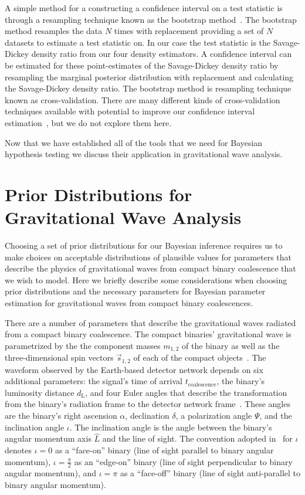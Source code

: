 A simple method for a constructing a confidence interval on a test statistic is through a resampling technique known as the bootstrap method~\cite{efron1992bootstrap}. The bootstrap method resamples the data $N$ times with replacement providing a set of $N$ datasets to estimate a test statistic on. In our case the test statistic is the Savage-Dickey density ratio from our four density estimators. A confidence interval can be estimated for these point-estimates of the Savage-Dickey density ratio by resampling the marginal posterior distribution with replacement and calculating the Savage-Dickey density ratio. The bootstrap method is resampling technique known as cross-validation. There are many different kinds of cross-validation techniques available with potential to improve our confidence interval estimation~\cite{efron1997improvements, vehtari2017practical}, but we do not explore them here.

Now that we have established all of the tools that we need for Bayesian hypothesis testing we discuss their application in gravitational wave analysis.

\section{Prior Distributions for Gravitational Wave Analysis}
Choosing a set of prior distributions for our Bayesian inference requires
us to make choices on acceptable distributions of plausible values for parameters that
describe the physics of gravitational waves from compact binary
coalescence that we wish to model. Here we briefly describe some considerations when choosing
prior distributions and the necessary parameters for Bayesian parameter estimation
for gravitational waves from compact binary coalescences.

There are a number of parameters that describe the gravitational waves
radiated from a compact binary coalescence. The compact binaries'
gravitational wave is parametrized by the 
the component masses $m_{1,2}$ of the binary as well as the three-dimensional spin vectors
$\vec{s}_{1,2}$ of each of the compact objects~\cite{Hawking:1987en}.
The waveform observed by the
Earth-based detector network depends on six additional parameters: the
signal's time of arrival $t_\mathrm{coalescence}$, the binary's luminosity distance
$d_\mathrm{L}$, and four Euler angles that describe the transformation from the
binary's radiation frame to the detector network frame~\cite{Wahlquist:1987rx}.  These
angles are the binary's right ascension $\alpha$,
declination $\delta$, a polarization angle $\Psi$, and the inclination angle
$\iota$. The inclination angle is the angle between the binary's angular momentum axis $\hat{L}$ 
and the line of
sight. The convention adopted in \pycbc{}\ for $\iota$ denotes $\iota = 0$ as a
``face-on'' binary (line of sight parallel to binary angular momentum), $\iota
= \frac{\pi}{2}$ as an ``edge-on'' binary (line of sight perpendicular to
binary angular momentum), and $\iota = \pi$ as a ``face-off'' binary (line of
sight anti-parallel to binary angular momentum).  

